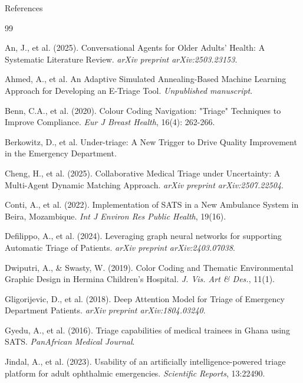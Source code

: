 \documentclass[aspectratio=169]{beamer}
\begin{document}
	
	\begin{frame}[allowframebreaks]{References}
		\tiny
		\begin{thebibliography}{99}
			
			An, J., et al. (2025). Conversational Agents for Older Adults' Health: A Systematic Literature Review. \textit{arXiv preprint arXiv:2503.23153}.
			
			Ahmed, A., et al. An Adaptive Simulated Annealing-Based Machine Learning Approach for Developing an E-Triage Tool. \textit{Unpublished manuscript}.
			
			Benn, C.A., et al. (2020). Colour Coding Navigation: "Triage" Techniques to Improve Compliance. \textit{Eur J Breast Health}, 16(4): 262-266.
			
			Berkowitz, D., et al. Under-triage: A New Trigger to Drive Quality Improvement in the Emergency Department. 
			
			Cheng, H., et al. (2025). Collaborative Medical Triage under Uncertainty: A Multi-Agent Dynamic Matching Approach. \textit{arXiv preprint arXiv:2507.22504}.
			
			Conti, A., et al. (2022). Implementation of SATS in a New Ambulance System in Beira, Mozambique. \textit{Int J Environ Res Public Health}, 19(16).
			
			Defilippo, A., et al. (2024). Leveraging graph neural networks for supporting Automatic Triage of Patients. \textit{arXiv preprint arXiv:2403.07038}.
			
			Dwiputri, A., \& Swasty, W. (2019). Color Coding and Thematic Environmental Graphic Design in Hermina Children's Hospital. \textit{J. Vis. Art \& Des.}, 11(1).
			
			Gligorijevic, D., et al. (2018). Deep Attention Model for Triage of Emergency Department Patients. \textit{arXiv preprint arXiv:1804.03240}.
			
			Gyedu, A., et al. (2016). Triage capabilities of medical trainees in Ghana using SATS. \textit{PanAfrican Medical Journal}.
			
			Jindal, A., et al. (2023). Usability of an artificially intelligence-powered triage platform for adult ophthalmic emergencies. \textit{Scientific Reports}, 13:22490.
			

\end{thebibliography}
\end{frame}
\end{document}
